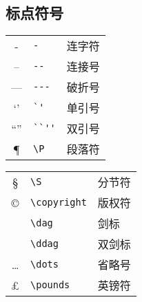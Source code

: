 \subsection{标点符号}
\begin{table}[h]
	\centering
	\begin{minipage}[t]{0.46\textwidth}
		\centering
		\begin{tabular}{c p{7em} p{5em}}
			\hline
			-          & \verb|-|          & 连字符 \\
			--         & \verb|--|         & 连接号 \\
			---        & \verb|---|        & 破折号 \\
			`'         & \verb|`'|         & 单引号 \\
			``''       & \verb|``''|       & 双引号 \\
			\P         & \verb|\P|         & 段落符 \\
			\hline
		\end{tabular}
	\end{minipage}
	\qquad
	\begin{minipage}[t]{0.46\textwidth}
		\centering
		\begin{tabular}{c p{7em} p{5em}}
			\hline
			\S         & \verb|\S|         & 分节符 \\
			\copyright & \verb|\copyright| & 版权符 \\
			\dag       & \verb|\dag|       & 剑标 \\
			\ddag      & \verb|\ddag|      & 双剑标 \\
			\dots      & \verb|\dots|      & 省略号 \\
			\pounds    & \verb|\pounds|    & 英镑符 \\
			\hline
		\end{tabular}
	\end{minipage}
\end{table}

\newpage
